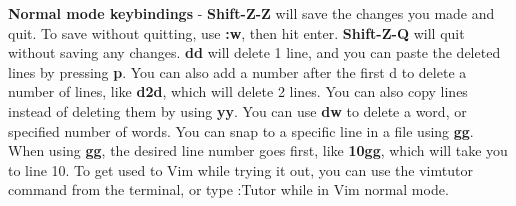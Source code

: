 \documentclass[12pt, letterpaper, twoside]{article}
\begin{document}
\textbf{Normal mode keybindings} - \textbf{Shift-Z-Z} will save the changes you made and quit. To save without quitting, use \textbf{:w}, then hit enter. \textbf{Shift-Z-Q} will quit without saving any changes. \textbf{dd} will delete 1 line, and you can paste the deleted lines by pressing \textbf{p}. You can also add a number after the first d to delete a number of lines, like \textbf{d2d}, which will delete 2 lines. You can also copy lines instead of deleting them by using \textbf{yy}. You can use \textbf{dw} to delete a word, or specified number of words. You can snap to a specific line in a file using \textbf{gg}. When using \textbf{gg}, the desired line number goes first, like \textbf{10gg}, which will take you to line 10. To get used to Vim while trying it out, you can use the vimtutor command from the terminal, or type :Tutor while in Vim normal mode.
\end{document}
